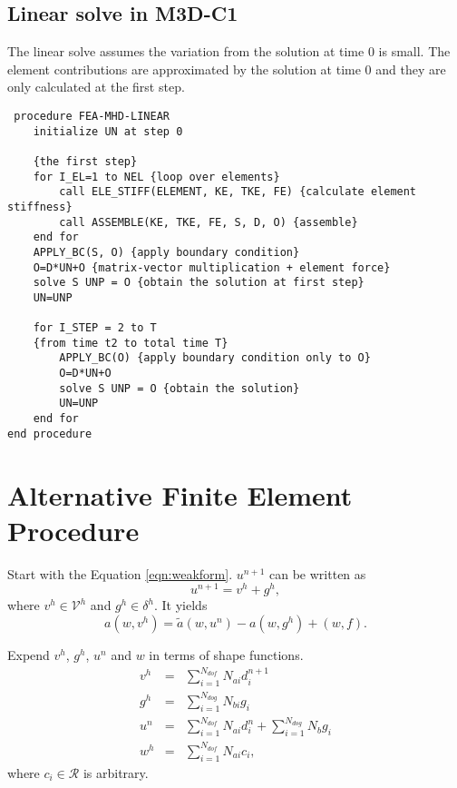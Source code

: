 \documentclass[11pt]{article}  %
\begin{document}
 \subsection{Linear solve in M3D-C1}
 The linear solve assumes the variation from the solution at time 0 is small.  The element contributions are approximated by the solution at time 0 and they are only calculated at the first step.
 \begin{samepage}
\begin{verbatim}
 procedure FEA-MHD-LINEAR
    initialize UN at step 0
  
    {the first step}
    for I_EL=1 to NEL {loop over elements}
        call ELE_STIFF(ELEMENT, KE, TKE, FE) {calculate element stiffness}
        call ASSEMBLE(KE, TKE, FE, S, D, O) {assemble}
    end for
    APPLY_BC(S, O) {apply boundary condition}
    O=D*UN+O {matrix-vector multiplication + element force}
    solve S UNP = O {obtain the solution at first step}
    UN=UNP
    
    for I_STEP = 2 to T
    {from time t2 to total time T}
        APPLY_BC(O) {apply boundary condition only to O} 
        O=D*UN+O
        solve S UNP = O {obtain the solution}
        UN=UNP
    end for
end procedure
\end{verbatim}
\end{samepage}
 \section{Alternative Finite Element Procedure} \label{sec:alt}
Start with the Equation \ref{eqn:weakform}.  $u^{n+1}$ can be written as
\begin{equation}
u^{n+1}=v^h+g^h,
\end{equation}
where $v^h\in \mathcal{V}^h$ and $g^h\in \mathcal{\delta}^h$. It yields
\begin{equation}
a(w, v^{h}) = \tilde{a}(w, u^n) - a(w, g^h)+ (w,f).
\end{equation}

Expend $v^h$, $g^h$, $u^n$ and $w$ in terms of shape functions.
\begin{eqnarray}
v^h&=&\sum_{i=1}^{N_{dof}} N_{ai} d_{i}^{n+1}\\
g^h&=&\sum_{i=1}^{N_{dog}} N_{bi} g_i \\
u^n &=&\sum_{i=1}^{N_{dof}} N_{ai} d_{i}^{n}+\sum_{i=1}^{N_{dog}} N_{b} g_i \\
w^{h}&=&\sum_{i=1}^{N_{dof}} N_{ai} c_{i},
\end{eqnarray}
where $c_i\in \mathcal{R}$ is arbitrary.
\end{document}
